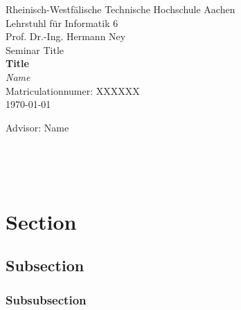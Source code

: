 \documentclass[twoside,11pt,a4paper]{article}
\theoremstyle{break}
\begin{document}
\pagestyle{empty}

\begin{center}

    Rheinisch-Westf\"alische Technische Hochschule Aachen \\
    Lehrstuhl f\"ur Informatik 6 \\
    Prof. Dr.-Ing. Hermann Ney\\[6ex]
    Seminar Title\\[12ex]
   
    \LARGE
    \textbf{Title} \\[6ex]
    \textit{Name} \\[6ex]
    \Large
    Matriculationnumer: XXXXXX \\[6ex]
    \today

    \vfill
    \Large Advisor: Name
	    
\end{center}

\newpage
\ 
\newpage

\pagestyle{headings}
\tableofcontents
\listoftables
\listoffigures
\newpage
\pagestyle{empty}
\ 
\newpage
\pagestyle{headings}

\section{Section}
\subsection{Subsection}
\subsubsection{Subsubsection}



\end{document}
